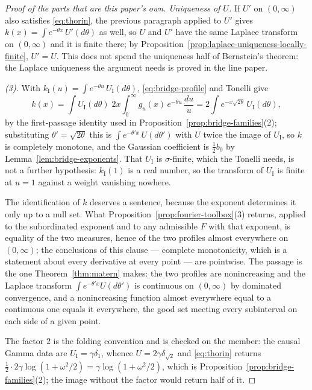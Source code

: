 \begin{proof}[Proof of the parts that are this paper's own]
\emph{Uniqueness of $U$.} If $U'$ on $(0,\infty)$ also satisfies \ref{eq:thorin}, the previous
paragraph applied to $U'$ gives $k(x) = \int e^{-\theta x}\,U'(d\theta)$ as well, so $U$ and $U'$
have the same Laplace transform on $(0,\infty)$ and it is finite there; by
Proposition~\ref{prop:laplace-uniqueness-locally-finite}, $U' = U$. This does not spend the
uniqueness half of Bernstein's theorem: the Laplace uniqueness the argument needs is proved in
the line paper.

\emph{(3).} With $k_{\mathrm I}(u) = \int e^{-\theta u}\,U_{\mathrm I}(d\theta)$,
\ref{eq:bridge-profile} and Tonelli give
\[
  k(x) = \int U_{\mathrm I}(d\theta)\;2x\int_0^\infty g_u(x)\,e^{-\theta u}\,\frac{du}{u}
       = 2\int e^{-x\sqrt{2\theta}}\,U_{\mathrm I}(d\theta),
\]
by the first-passage identity used in Proposition~\ref{prop:bridge-families}(2); substituting
$\theta' = \sqrt{2\theta}$ this is $\int e^{-\theta'x}\,U(d\theta')$ with $U$ twice the image
of $U_{\mathrm I}$, so $k$ is completely monotone, and the Gaussian coefficient is
$\tfrac12 b_0$ by Lemma~\ref{lem:bridge-exponents}. That $U_{\mathrm I}$ is $\sigma$-finite,
which the Tonelli needs, is not a further hypothesis: $k_{\mathrm I}(1)$ is a real number, so
the transform of $U_{\mathrm I}$ is finite at $u = 1$ against a weight vanishing nowhere.

The identification of $k$ deserves a sentence, because the exponent determines it only up to a
null set. What Proposition~\ref{prop:fourier-toolbox}(3) returns, applied to the subordinated
exponent and to any admissible $F$ with that exponent, is equality of the two \Levy{} measures,
hence of the two profiles almost everywhere on $(0,\infty)$; the conclusions of this clause ---
complete monotonicity, which is a statement about every derivative at every point --- are
pointwise. The passage is the one Theorem~\ref{thm:matern} makes: the two profiles are
nonincreasing and the Laplace transform $\int e^{-\theta'x}U(d\theta')$ is continuous on
$(0,\infty)$ by dominated convergence, and a nonincreasing function almost everywhere equal to
a continuous one equals it everywhere, the good set meeting every subinterval on each side of a
given point.

The factor $2$ is the folding convention and is checked on the \Matern{} member: the causal
Gamma data are $U_{\mathrm I} = \gamma\delta_1$, whence $U = 2\gamma\delta_{\sqrt2}$ and
\ref{eq:thorin} returns
$\tfrac12\cdot 2\gamma\log(1+\omega^2/2) = \gamma\log(1+\omega^2/2)$, which is
Proposition~\ref{prop:bridge-families}(2); the image without the factor would return half of it.


\end{proof}
